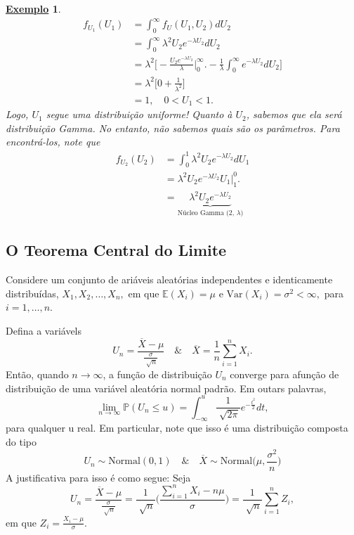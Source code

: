 \documentclass{article}
\newtheorem{example}{\underline{Exemplo}}
\begin{document}
\begin{example}
\begin{align*}
    f_{U_{1}}(U_{1}) &= \int_{0}^{\infty}f_{U}(U_{1}, U_{2}) dU_{2} \\
                     &= \int_{0}^{\infty}\lambda ^{2}U_{2}e^{-\lambda U_{2}}dU_{2}\\
                     &= \lambda ^{2}\biggl[-\frac{U_{2}e^{-\lambda U_{2}}}{\lambda }\biggl|_{0}^{\infty}\biggr. - \frac{1}{\lambda }\int_{0}^{\infty}e^{-\lambda U_{2}}dU_{2}\biggr]\\
                     &= \lambda ^{2}\biggl[ 0 + \frac{1}{\lambda^{2}} \biggr]\\
                     &= 1,\quad 0 < U_{1} < 1.
  \end{align*}
  Logo, \(U_{1}\) segue uma distribuição uniforme! Quanto à \(U_{2}\), sabemos que ela será distribuição Gamma. No entanto,
  não sabemos quais são os parâmetros. Para encontrá-los, note que 
  \begin{align*}
    f_{U_{2}}(U_{2}) &= \int_{0}^{1}\lambda ^{2} U_{2}e^{-\lambda U_{2}}dU_{1} \\
                     &= \lambda ^{2} U_{2}e^{-\lambda U_{2}}U_{1}\biggl|_{1}^{0}\biggr.\\
                     &= \underbrace{\lambda ^{2}U_{2}e^{-\lambda U_{2}}}_{\text{Núcleo Gamma (2, }\lambda \text{)}}
  \end{align*}
\end{example}
\subsection{O Teorema Central do Limite}
Considere um conjunto de ariáveis aleatórias independentes e identicamente distribuídas, \(X_{1}, X_{2}, \dotsc , X_{n},\) em que \(\mathbb{E}(X_{i}) = \mu\) e 
\(\mathrm{Var}(X_{i}) = \sigma^{2} < \infty,\) para \(i = 1, \dotsc , n.\)

Defina a variávels 
\[
  U_{n} = \frac{\overline{X} - \mu}{\frac{\sigma }{\sqrt[]{n}}}\quad\&\quad \overline{X} = \frac{1}{n}\sum\limits_{i=1}^{n}X_{i}.
\]
Então, quando \(n\to\infty\), a função de distribuição \(U_{n}\) converge para afunção de distribuição de uma variável aleatória
normal padrão. Em outars palavras, 
\[
  \lim_{n\to \infty}\mathbb{P}(U_{n}\leq u) = \int_{-\infty}^{u}\frac{1}{\sqrt[]{2\pi }}e^{-\frac{t^{2}}{2}}dt,
\]
para qualquer u real. Em particular, note que isso é uma distribuição composta do tipo 
  \[
    U_{n}\sim \mathrm{Normal}(0, 1)\quad\&\quad \overline{X}\sim \mathrm{Normal}\biggl(\mu, \frac{\sigma ^{2}}{n}\biggr)
  \]
  A justificativa para isso é como segue: Seja 
  \[
    U_{n} = \frac{\overline{X} - \mu }{\frac{\sigma }{\sqrt[]{n}}} = \frac{1}{\sqrt[]{n}}\biggl(\frac{\sum\limits_{i=1}^{n}X_{i} - n\mu }{\sigma }\biggr) = \frac{1}{\sqrt[]{n}}\sum\limits_{i=1}^{n}Z_{i},
  \]
  em que \(Z_{i} = \frac{X_{i}-\mu}{\sigma }\).
\end{document}
